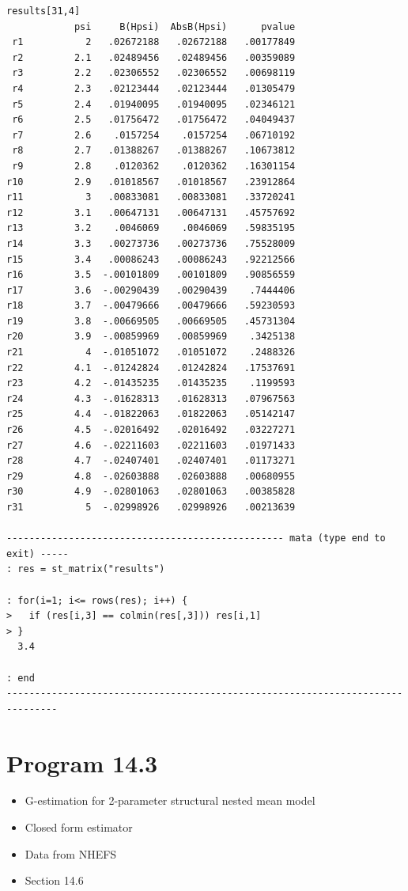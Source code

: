 \documentclass[
  10pt,
]{book}
\providecommand{\tightlist}{%
  \setlength{\itemsep}{0pt}\setlength{\parskip}{0pt}}
\begin{document}
\begin{verbatim}
results[31,4]
            psi     B(Hpsi)  AbsB(Hpsi)      pvalue
 r1           2   .02672188   .02672188   .00177849
 r2         2.1   .02489456   .02489456   .00359089
 r3         2.2   .02306552   .02306552   .00698119
 r4         2.3   .02123444   .02123444   .01305479
 r5         2.4   .01940095   .01940095   .02346121
 r6         2.5   .01756472   .01756472   .04049437
 r7         2.6    .0157254    .0157254   .06710192
 r8         2.7   .01388267   .01388267   .10673812
 r9         2.8    .0120362    .0120362   .16301154
r10         2.9   .01018567   .01018567   .23912864
r11           3   .00833081   .00833081   .33720241
r12         3.1   .00647131   .00647131   .45757692
r13         3.2    .0046069    .0046069   .59835195
r14         3.3   .00273736   .00273736   .75528009
r15         3.4   .00086243   .00086243   .92212566
r16         3.5  -.00101809   .00101809   .90856559
r17         3.6  -.00290439   .00290439    .7444406
r18         3.7  -.00479666   .00479666   .59230593
r19         3.8  -.00669505   .00669505   .45731304
r20         3.9  -.00859969   .00859969    .3425138
r21           4  -.01051072   .01051072    .2488326
r22         4.1  -.01242824   .01242824   .17537691
r23         4.2  -.01435235   .01435235    .1199593
r24         4.3  -.01628313   .01628313   .07967563
r25         4.4  -.01822063   .01822063   .05142147
r26         4.5  -.02016492   .02016492   .03227271
r27         4.6  -.02211603   .02211603   .01971433
r28         4.7  -.02407401   .02407401   .01173271
r29         4.8  -.02603888   .02603888   .00680955
r30         4.9  -.02801063   .02801063   .00385828
r31           5  -.02998926   .02998926   .00213639

------------------------------------------------- mata (type end to exit) -----
: res = st_matrix("results")

: for(i=1; i<= rows(res); i++) { 
>   if (res[i,3] == colmin(res[,3])) res[i,1]
> }
  3.4

: end
-------------------------------------------------------------------------------
\end{verbatim}

\hypertarget{program-14.3-1}{%
\section{Program 14.3}\label{program-14.3-1}}

\begin{itemize}
\tightlist
\item
  G-estimation for 2-parameter structural nested mean model
\item
  Closed form estimator
\item
  Data from NHEFS
\item
  Section 14.6
\end{itemize}
\end{document}

